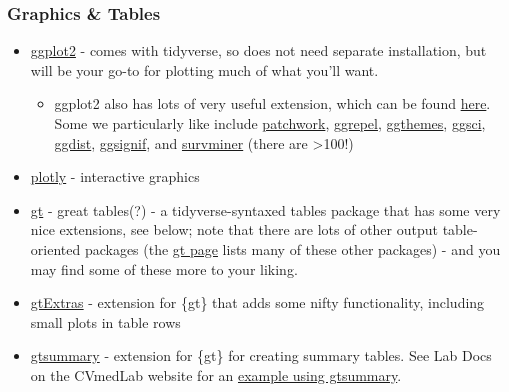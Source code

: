\documentclass[
  letterpaper,
  DIV=11,
  numbers=noendperiod]{scrreprt}
\providecommand{\tightlist}{%
  \setlength{\itemsep}{0pt}\setlength{\parskip}{0pt}}\usepackage{longtable,booktabs,array}
\begin{document}
\hypertarget{graphics-tables}{%
\subsubsection*{Graphics \& Tables}\label{graphics-tables}}

\begin{itemize}
\item
  \href{https://ggplot2.tidyverse.org/}{ggplot2} - comes with tidyverse,
  so does not need separate installation, but will be your go-to for
  plotting much of what you'll want.

  \begin{itemize}
  \tightlist
  \item
    ggplot2 also has lots of very useful extension, which can be found
    \href{https://exts.ggplot2.tidyverse.org/gallery/}{here}. Some we
    particularly like include
    \href{https://github.com/thomasp85/patchwork\#patchwork}{patchwork},
    \href{https://github.com/slowkow/ggrepel}{ggrepel},
    \href{https://github.com/jrnold/ggthemes}{ggthemes},
    \href{https://nanx.me/ggsci/}{ggsci},
    \href{https://mjskay.github.io/ggdist}{ggdist},
    \href{https://github.com/const-ae/ggsignif}{ggsignif}, and
    \href{http://www.sthda.com/english/rpkgs/survminer/}{survminer}
    (there are \textgreater100!)
  \end{itemize}
\item
  \href{https://plotly.com/r/getting-started/}{plotly} - interactive
  graphics
\item
  \href{https://gt.rstudio.com/}{gt} - great tables(?) - a
  tidyverse-syntaxed tables package that has some very nice extensions,
  see below; note that there are lots of other output table-oriented
  packages (the
  \href{https://gt.rstudio.com/\#how-gt-fits-in-with-other-packages-that-generate-display-tables}{gt
  page} lists many of these other packages) - and you may find some of
  these more to your liking.
\item
  \href{https://jthomasmock.github.io/gtExtras/}{gtExtras} - extension
  for \{gt\} that adds some nifty functionality, including small plots
  in table rows
\item
  \href{https://www.danieldsjoberg.com/gtsummary/}{gtsummary} -
  extension for \{gt\} for creating summary tables. See Lab Docs on the
  CVmedLab website for an
  \href{https://cvmedlab.github.io/labdocs/table1_gtsummary.html}{example
  using gtsummary}.
\end{itemize}
\end{document}
